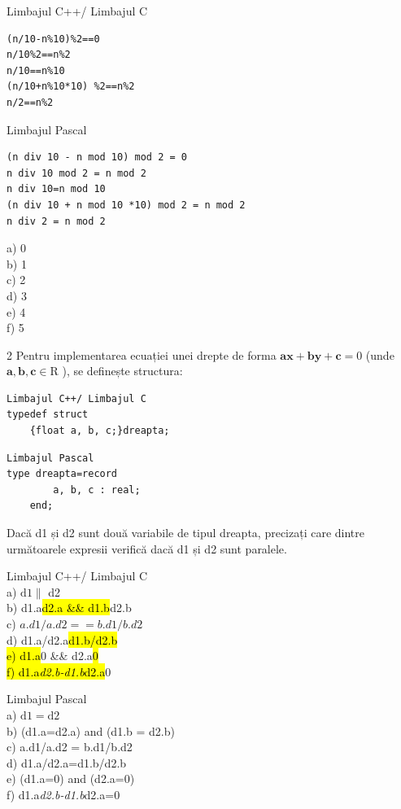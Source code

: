 \documentclass[10pt]{article}
\begin{document}
Limbajul C++/ Limbajul C

\begin{verbatim}
(n/10-n%10)%2==0
n/10%2==n%2
n/10==n%10
(n/10+n%10*10) %2==n%2
n/2==n%2
\end{verbatim}

Limbajul Pascal

\begin{verbatim}
(n div 10 - n mod 10) mod 2 = 0
n div 10 mod 2 = n mod 2
n div 10=n mod 10
(n div 10 + n mod 10 *10) mod 2 = n mod 2
n div 2 = n mod 2
\end{verbatim}

a) 0\\
b) 1\\
c) 2\\
d) 3\\
e) 4\\
f) 5

2 Pentru implementarea ecuației unei drepte de forma $\mathbf{a x + b y}+\mathbf{c}=0$ (unde $\mathbf{a}, \mathbf{b}, \mathbf{c} \in \mathrm{R}$ ), se definește structura:

\begin{verbatim}
Limbajul C++/ Limbajul C
typedef struct
    {float a, b, c;}dreapta;
\end{verbatim}

\begin{verbatim}
Limbajul Pascal
type dreapta=record
        a, b, c : real;
    end;
\end{verbatim}

Dacă d1 și d2 sunt două variabile de tipul dreapta, precizați care dintre următoarele expresii verifică dacă d1 și d2 sunt paralele.

Limbajul C++/ Limbajul C\\
a) $\mathrm{d} 1 \mathrm{\|}$ d2\\
b) d1.a\hl{d2.a \&\& d1.b}d2.b\\
c) $a . d 1 / a . d 2==b . d 1 / b . d 2$\\
d) d1.a/d2.a\hl{d1.b/d2.b\\
e) d1.a}0 \&\& d2.a\hl{0\\
f) d1.a\textit{d2.b-d1.b}d2.a}0

Limbajul Pascal\\
a) $\mathrm{d} 1=\mathrm{d} 2$\\
b) (d1.a=d2.a) and (d1.b = d2.b)\\
c) a.d1/a.d2 = b.d1/b.d2\\
d) d1.a/d2.a=d1.b/d2.b\\
e) (d1.a=0) and (d2.a=0)\\
f) d1.a\textit{d2.b-d1.b}d2.a=0
\end{document}
